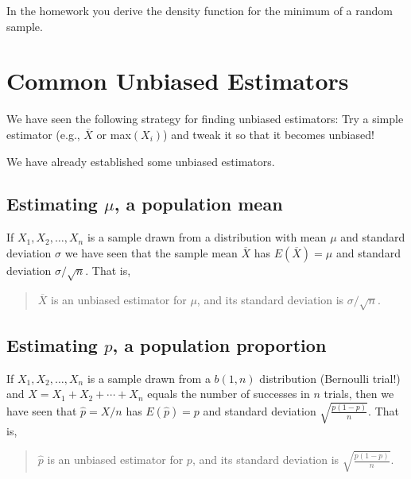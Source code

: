 \documentclass[
]{book}
\theoremstyle{definition}
\theoremstyle{definition}
\theoremstyle{definition}
\theoremstyle{definition}
\theoremstyle{remark}
\begin{document}
In the homework you derive the density function for the minimum of a random sample.

\section{Common Unbiased Estimators}\label{common-unbiased-estimators}

We have seen the following strategy for finding unbiased estimators: Try a simple estimator (e.g., \(\overline{X}\) or max\((X_i)\)) and tweak it so that it becomes unbiased!

We have already established some unbiased estimators.

\subsection{\texorpdfstring{Estimating \(\mu\), a population mean}{Estimating \textbackslash mu, a population mean}}\label{estimating-mu-a-population-mean}

If \(X_1, X_2, \ldots, X_n\) is a sample drawn from a distribution with mean \(\mu\) and standard deviation \(\sigma\) we have seen that the sample mean \(\overline{X}\) has \(E(\overline{X}) = \mu\) and standard deviation \(\sigma/\sqrt{n}\). That is,

\begin{quote}
\(\overline{X}\) is an unbiased estimator for \(\mu\), and its standard deviation is \(\sigma/\sqrt{n}\).
\end{quote}

\subsection{\texorpdfstring{Estimating \(p\), a population proportion}{Estimating p, a population proportion}}\label{estimating-p-a-population-proportion}

If \(X_1, X_2, \ldots, X_n\) is a sample drawn from a \(b(1,n)\) distribution (Bernoulli trial!) and \(X = X_1 + X_2 + \cdots + X_n\) equals the number of successes in \(n\) trials, then we have seen that \(\hat{p} = X/n\) has \(E(\hat{p}) = p\) and standard deviation \(\displaystyle\sqrt{\frac{p(1-p)}{n}}\). That is,

\begin{quote}
\(\hat{p}\) is an unbiased estimator for \(p\), and its standard deviation is \(\displaystyle\sqrt{\frac{p(1-p)}{n}}\).
\end{quote}
\end{document}

